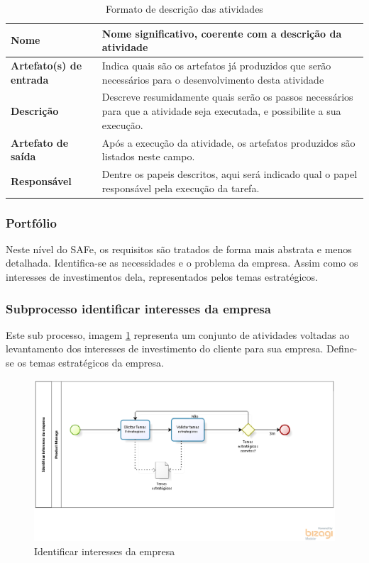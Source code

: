\begin{table}[h]
    \centering
    \label{descricaoAtividades}
    \caption{Formato de descrição das atividades}
        \begin{tabular}{|l|p{10cm}|}
        \hline
        \textbf{Nome} & Nome significativo, coerente com a descrição da atividade \\
        \hline
        \textbf{Artefato(s) de entrada} & Indica quais são os artefatos já produzidos que serão necessários para o desenvolvimento desta atividade \\
        \hline
        \textbf{Descrição} & Descreve resumidamente quais serão os passos necessários para que a atividade seja executada, e possibilite a sua execução. \\
        \hline
        \textbf{Artefato de saída} & Após a execução da atividade, os artefatos produzidos são listados neste campo. \\
        \hline
        \textbf{Responsável} & Dentre os papeis descritos, aqui será indicado qual o papel responsável pela execução da tarefa.\\
        \hline
    \end{tabular}
\end{table}

\subsubsection{Portfólio}

Neste nível do SAFe, os requisitos são tratados de forma mais abstrata e menos detalhada. Identifica-se as necessidades e o problema da empresa. Assim como os interesses de investimentos dela, representados pelos temas estratégicos.

\subsubsection{Subprocesso identificar interesses da empresa}

Este sub processo, imagem \ref{processoInteresses} representa um conjunto de atividades voltadas ao levantamento dos interesses de investimento do cliente para sua empresa. Define-se os temas estratégicos da empresa.

\begin{figure}[H]
    \centering
    \caption{Identificar interesses da empresa}
    \label{processoInteresses}
    \includegraphics[keepaspectratio=true,scale=0.5]{figuras/processoInteresses.eps}
\end{figure}


